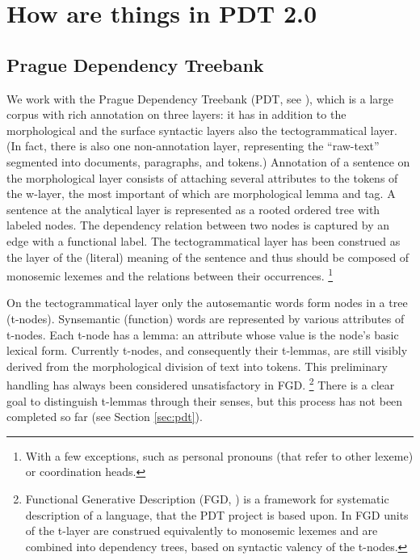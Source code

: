 
\chapter{How are things in PDT 2.0}\label{PDT}
\label{sec:pdt}
\section{Prague Dependency Treebank}
\label{sec:pdt/pdt}
We work with the Prague Dependency Treebank (PDT, see \citealp{hajic:2005}), which is a large corpus with rich annotation on three layers: it has in addition to the morphological and the surface syntactic layers also the tectogrammatical layer.
(In fact, there is also one non-annotation layer, representing the ``raw-text'' segmented into documents, paragraphs, and tokens.)
Annotation of a sentence on the morphological layer consists of attaching several attributes to the tokens of the w-layer, the most important of which are morphological lemma and tag.
A sentence at the analytical layer is represented as a rooted ordered tree with labeled nodes. The dependency relation between two nodes is captured by an edge with a functional label.
The tectogrammatical layer has been construed as the layer of the (literal) meaning of the sentence and thus should be composed of monosemic lexemes and the relations between their occurrences.%
\footnote{With a few exceptions, such as personal pronouns (that refer to other lexeme) or coordination heads.}

On the tectogrammatical layer only the autosemantic words form nodes in a tree (t-nodes). Synsemantic (function) words are represented by various attributes of t-nodes. Each t-node has a lemma: an attribute whose value is the node's basic lexical form.
Currently t-nodes, and consequently their t-lemmas, are still visibly derived from the morphological division of text into tokens. This preliminary handling has always been considered unsatisfactory in FGD.%
\footnote{Functional Generative Description (FGD, \citealp{sgall-etal:1986,hajicova:1998}) is a framework for systematic description of a language, that the PDT project is based upon. In FGD units of the t-layer are construed equivalently to monosemic lexemes and are combined into dependency trees, based on syntactic valency of the t-nodes.}
There is a clear goal to distinguish t-lemmas through their senses, but %
this process has not been completed so far (see Section \ref{sec:pdt}).

